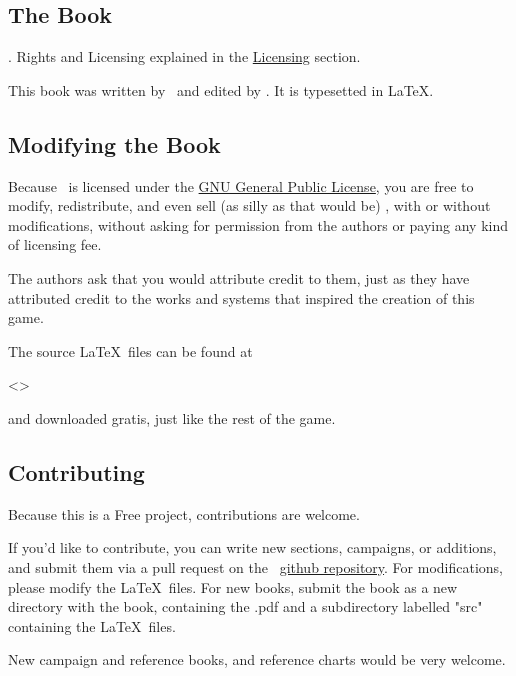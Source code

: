 \subsection{The Book}
\par
{} \zandy . Rights and Licensing explained in the \hyperlink{Licensing}{Licensing} section. 

\par
This book was written by \zandy\, and edited by \sam . It is typesetted in \LaTeX .

\subsection{Modifying the Book}

\par
Because \getTitle\, is licensed under the \hyperlink{Licensing}{GNU General Public License}, you are free to modify, redistribute, and even sell (as silly as that would be) \getTitle , with or without modifications, without asking for permission from the authors or paying any kind of licensing fee.

\par
The authors ask that you would attribute credit to them, just as they have attributed credit to the works and systems that inspired the creation of this game.

\par
The source \LaTeX\, files can be found at 
\par
<\website >
\par
and downloaded gratis, just like the rest of the game.

\subsection{Contributing}

\par
Because this is a Free project, contributions are welcome.

\par
If you'd like to contribute, you can write new sections, campaigns, or additions, and submit them via a pull request on the \getTitle\, \hyperlink{https://github.com/Zanderwohl/TechSense}{github repository}. For modifications, please modify the \LaTeX\, files. For new books, submit the book as a new directory with the book, containing the .pdf and a subdirectory labelled "src" containing the \LaTeX\, files.

\par
New campaign and reference books, and reference charts would be very welcome.

